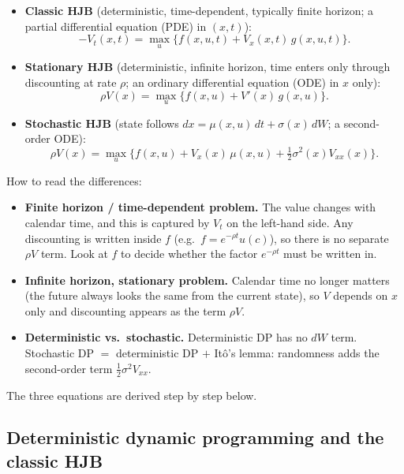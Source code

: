 \begin{keybox}[title=Three forms of the HJB equation]
\begin{itemize}
\item \textbf{Classic HJB} (deterministic, time-dependent, typically finite horizon; a partial differential equation (PDE) in $(x,t)$):
\begin{equation}\label{eq:hjb-classic}
-V_t(x,t)=\max_u\big\{f(x,u,t)+V_x(x,t)\,g(x,u,t)\big\}.
\end{equation}
\item \textbf{Stationary HJB} (deterministic, infinite horizon, time enters only through discounting at rate $\rho$; an ordinary differential equation (ODE) in $x$ only):
\begin{equation}\label{eq:hjb-stat}
\rho V(x)=\max_u\big\{f(x,u)+V'(x)\,g(x,u)\big\}.
\end{equation}
\item \textbf{Stochastic HJB} (state follows $dx=\mu(x,u)\,dt+\sigma(x)\,dW$; a second-order ODE):
\begin{equation}\label{eq:hjb-stoch}
\rho V(x)=\max_u\Big\{f(x,u)+V_x(x)\,\mu(x,u)+\tfrac12\sigma^2(x)V_{xx}(x)\Big\}.
\end{equation}
\end{itemize}
\end{keybox}

How to read the differences:
\begin{itemize}
\item \textbf{Finite horizon / time-dependent problem.} The value changes with calendar time, and this is captured by $V_t$ on the left-hand side. Any discounting is written inside $f$ (e.g.\ $f=e^{-\rho t}u(c)$), so there is no separate $\rho V$ term. Look at $f$ to decide whether the factor $e^{-\rho t}$ must be written in.
\item \textbf{Infinite horizon, stationary problem.} Calendar time no longer matters (the future always looks the same from the current state), so $V$ depends on $x$ only and discounting appears as the term $\rho V$.
\item \textbf{Deterministic vs.\ stochastic.} Deterministic DP has no $dW$ term. Stochastic DP $=$ deterministic DP $+$ It\^o's lemma: randomness adds the second-order term $\tfrac12\sigma^2V_{xx}$.
\end{itemize}
The three equations are derived step by step below.

\subsection{Deterministic dynamic programming and the classic HJB }

